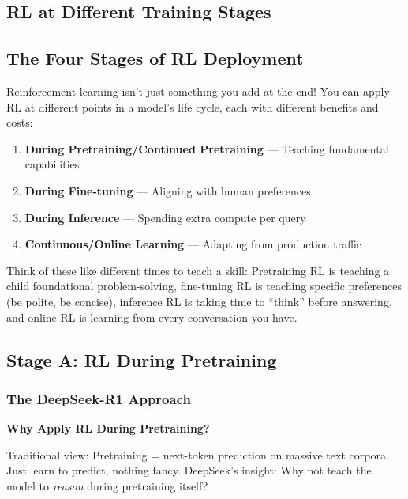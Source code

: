 \begin{chapterenv}

\chapter{RL at Different Training Stages}

\section{The Four Stages of RL Deployment}

Reinforcement learning isn't just something you add at the end! You can apply RL at different points in a model's life cycle, each with different benefits and costs:

\begin{enumerate}[nosep]
    \item \textbf{During Pretraining/Continued Pretraining} --- Teaching fundamental capabilities
    \item \textbf{During Fine-tuning} --- Aligning with human preferences
    \item \textbf{During Inference} --- Spending extra compute per query
    \item \textbf{Continuous/Online Learning} --- Adapting from production traffic
\end{enumerate}

Think of these like different times to teach a skill: Pretraining RL is teaching a child foundational problem-solving, fine-tuning RL is teaching specific preferences (be polite, be concise), inference RL is taking time to ``think'' before answering, and online RL is learning from every conversation you have.

\section{Stage A: RL During Pretraining}

\subsection{The DeepSeek-R1 Approach}

\begin{infobox}
\textbf{Why Apply RL During Pretraining?}

Traditional view: Pretraining = next-token prediction on massive text corpora. Just learn to predict, nothing fancy. DeepSeek's insight: Why not teach the model to \textit{reason} during pretraining itself?


\end{infobox}
\end{chapterenv}
